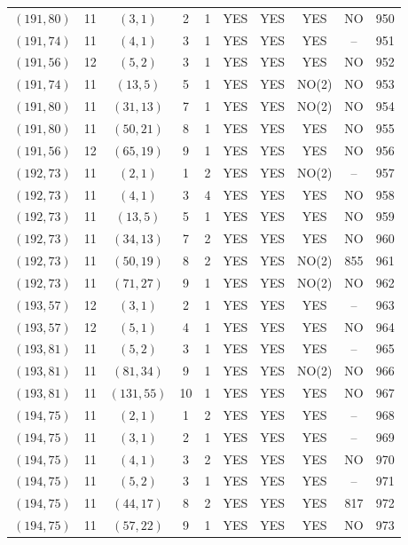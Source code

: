 \begin{longtable}{|c|c|c|c|c|c|c|c|c|c|}
$(191, 80)$ & 11 & $(3, 1)$ & 2 & 1 & YES & YES & YES & NO & 950\\
$(191, 74)$ & 11 & $(4, 1)$ & 3 & 1 & YES & YES & YES & -- & 951\\
$(191, 56)$ & 12 & $(5, 2)$ & 3 & 1 & YES & YES & YES & NO & 952\\
$(191, 74)$ & 11 & $(13, 5)$ & 5 & 1 & YES & YES & NO(2) & NO & 953\\
$(191, 80)$ & 11 & $(31, 13)$ & 7 & 1 & YES & YES & NO(2) & NO & 954\\
$(191, 80)$ & 11 & $(50, 21)$ & 8 & 1 & YES & YES & YES & NO & 955\\
$(191, 56)$ & 12 & $(65, 19)$ & 9 & 1 & YES & YES & YES & NO & 956\\
$(192, 73)$ & 11 & $(2, 1)$ & 1 & 2 & YES & YES & NO(2) & -- & 957\\
$(192, 73)$ & 11 & $(4, 1)$ & 3 & 4 & YES & YES & YES & NO & 958\\
$(192, 73)$ & 11 & $(13, 5)$ & 5 & 1 & YES & YES & YES & NO & 959\\
$(192, 73)$ & 11 & $(34, 13)$ & 7 & 2 & YES & YES & YES & NO & 960\\
$(192, 73)$ & 11 & $(50, 19)$ & 8 & 2 & YES & YES & NO(2) & 855 & 961\\
$(192, 73)$ & 11 & $(71, 27)$ & 9 & 1 & YES & YES & NO(2) & NO & 962\\
$(193, 57)$ & 12 & $(3, 1)$ & 2 & 1 & YES & YES & YES & -- & 963\\
$(193, 57)$ & 12 & $(5, 1)$ & 4 & 1 & YES & YES & YES & NO & 964\\
$(193, 81)$ & 11 & $(5, 2)$ & 3 & 1 & YES & YES & YES & -- & 965\\
$(193, 81)$ & 11 & $(81, 34)$ & 9 & 1 & YES & YES & NO(2) & NO & 966\\
$(193, 81)$ & 11 & $(131, 55)$ & 10 & 1 & YES & YES & YES & NO & 967\\
$(194, 75)$ & 11 & $(2, 1)$ & 1 & 2 & YES & YES & YES & -- & 968\\
$(194, 75)$ & 11 & $(3, 1)$ & 2 & 1 & YES & YES & YES & -- & 969\\
$(194, 75)$ & 11 & $(4, 1)$ & 3 & 2 & YES & YES & YES & NO & 970\\
$(194, 75)$ & 11 & $(5, 2)$ & 3 & 1 & YES & YES & YES & -- & 971\\
$(194, 75)$ & 11 & $(44, 17)$ & 8 & 2 & YES & YES & YES & 817 & 972\\
$(194, 75)$ & 11 & $(57, 22)$ & 9 & 1 & YES & YES & YES & NO & 973\\

\end{longtable}
